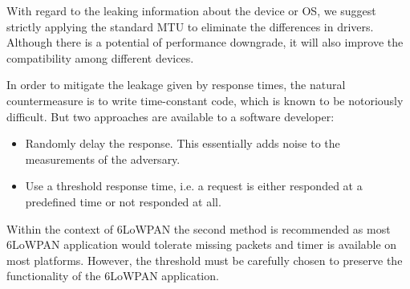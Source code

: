 \documentclass{article}
\begin{document}
With regard to the leaking information about the device or OS, we suggest strictly applying the standard MTU to eliminate the differences in drivers. Although there is a potential of performance downgrade, it will also improve the compatibility among different devices.


In order to mitigate the leakage given by response times, the natural countermeasure is to write time-constant code, which is known to be notoriously difficult. But two approaches are available to a software developer:
\begin{itemize}
	\item Randomly delay the response. This essentially adds noise to the measurements of the adversary.
	 
	\item Use a threshold response time, i.e. a request is either responded at a predefined time or not responded at all. 
\end{itemize}
Within the context of 6LoWPAN the second method is recommended as most 6LoWPAN application would tolerate missing packets and timer is available on most platforms. However, the threshold must be carefully chosen to preserve the functionality of the 6LoWPAN application.





\appendix










%
%
\end{document}
